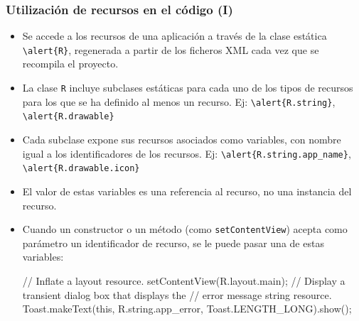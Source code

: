 \documentclass[hyperref={pdfpagelabels=true},ucs]{beamer}
\begin{document}
\begin{frame}[fragile,shrink=15]
\frametitle{Utilización de recursos en el código (I)}

\begin{itemize}
\item Se accede a los recursos de una aplicación a través de la clase
  estática \Verb|\alert{R}|, regenerada a partir de los ficheros XML cada vez
  que se recompila el proyecto.
\item La clase \verb|R| incluye subclases estáticas para cada uno de
  los tipos de recursos para los que se ha definido al menos un
  recurso. Ej: \Verb|\alert{R.string}|, \Verb|\alert{R.drawable}|
\item Cada subclase expone sus recursos asociados como variables, con
  nombre igual a los identificadores de los recursos. Ej:
  \Verb|\alert{R.string.app_name}|, \Verb|\alert{R.drawable.icon}|
\item El valor de estas variables es una referencia al recurso, no una
  instancia del recurso.
\vspace{2mm}
\item Cuando un constructor o un método (como \verb|setContentView|)
  acepta como parámetro un identificador de recurso, se le puede pasar
  una de estas variables:
\begin{scriptsize}
\begin{block}{}
\begin{java}
// Inflate a layout resource.
setContentView(R.layout.main);
// Display a transient dialog box that displays the
// error message string resource.
Toast.makeText(this, R.string.app_error, Toast.LENGTH_LONG).show();
\end{java}
\end{block}
\end{scriptsize}
\end{itemize}

\end{frame}
\end{document}
